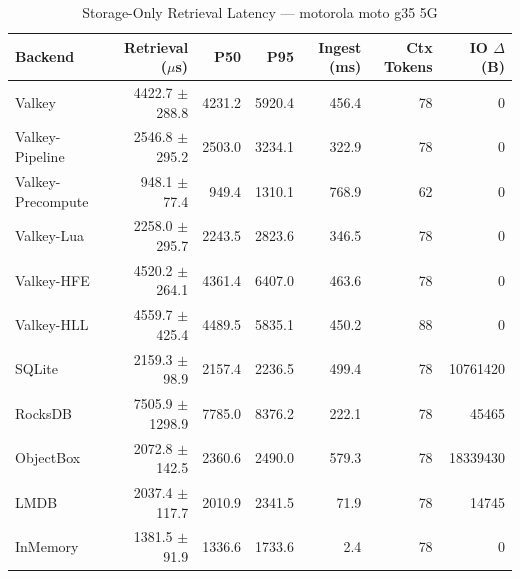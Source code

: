 \begin{table}[ht]
\centering
\caption{Storage-Only Retrieval Latency — motorola moto g35 5G}
\label{tab:storage-only}
\begin{tabular}{lrrrrrr}
\toprule
Backend & Retrieval ($\mu$s) & P50 & P95 & Ingest (ms) & Ctx Tokens & IO $\Delta$ (B) \\
\midrule
  Valkey & 4422.7 $\pm$ 288.8 & 4231.2 & 5920.4 & 456.4 & 78 & 0 \\
  Valkey-Pipeline & 2546.8 $\pm$ 295.2 & 2503.0 & 3234.1 & 322.9 & 78 & 0 \\
  Valkey-Precompute & 948.1 $\pm$ 77.4 & 949.4 & 1310.1 & 768.9 & 62 & 0 \\
  Valkey-Lua & 2258.0 $\pm$ 295.7 & 2243.5 & 2823.6 & 346.5 & 78 & 0 \\
  Valkey-HFE & 4520.2 $\pm$ 264.1 & 4361.4 & 6407.0 & 463.6 & 78 & 0 \\
  Valkey-HLL & 4559.7 $\pm$ 425.4 & 4489.5 & 5835.1 & 450.2 & 88 & 0 \\
  SQLite & 2159.3 $\pm$ 98.9 & 2157.4 & 2236.5 & 499.4 & 78 & 10761420 \\
  RocksDB & 7505.9 $\pm$ 1298.9 & 7785.0 & 8376.2 & 222.1 & 78 & 45465 \\
  ObjectBox & 2072.8 $\pm$ 142.5 & 2360.6 & 2490.0 & 579.3 & 78 & 18339430 \\
  LMDB & 2037.4 $\pm$ 117.7 & 2010.9 & 2341.5 & 71.9 & 78 & 14745 \\
  InMemory & 1381.5 $\pm$ 91.9 & 1336.6 & 1733.6 & 2.4 & 78 & 0 \\
\bottomrule
\end{tabular}
\end{table}
